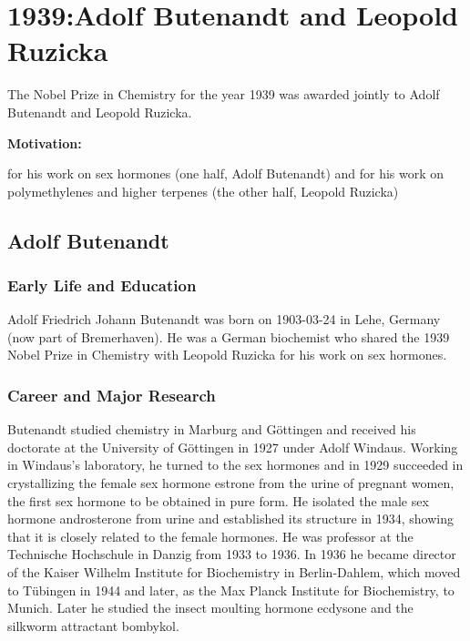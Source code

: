 \chapter{1939:Adolf Butenandt and Leopold Ruzicka}

\label{chap:chemistry1939}

The Nobel Prize in Chemistry for the year 1939 was awarded jointly to Adolf Butenandt and Leopold Ruzicka.

\textbf{Motivation:}

for his work on sex hormones (one half, Adolf Butenandt) and for his work on polymethylenes and higher terpenes (the other half, Leopold Ruzicka)

\section{Adolf Butenandt}

\subsection*{Early Life and Education}

Adolf Friedrich Johann Butenandt was born on 1903-03-24 in Lehe, Germany (now part of Bremerhaven).
He was a German biochemist who shared the 1939 Nobel Prize in Chemistry with Leopold Ruzicka for his work on sex hormones.

\subsection*{Career and Major Research}

Butenandt studied chemistry in Marburg and Göttingen and received his doctorate at the University of Göttingen in 1927 under Adolf Windaus.
Working in Windaus's laboratory, he turned to the sex hormones and in 1929 succeeded in crystallizing the female sex hormone estrone from the urine of pregnant women, the first sex hormone to be obtained in pure form.
He isolated the male sex hormone androsterone from urine and established its structure in 1934, showing that it is closely related to the female hormones.
He was professor at the Technische Hochschule in Danzig from 1933 to 1936.
In 1936 he became director of the Kaiser Wilhelm Institute for Biochemistry in Berlin-Dahlem, which moved to Tübingen in 1944 and later, as the Max Planck Institute for Biochemistry, to Munich.
Later he studied the insect moulting hormone ecdysone and the silkworm attractant bombykol.


